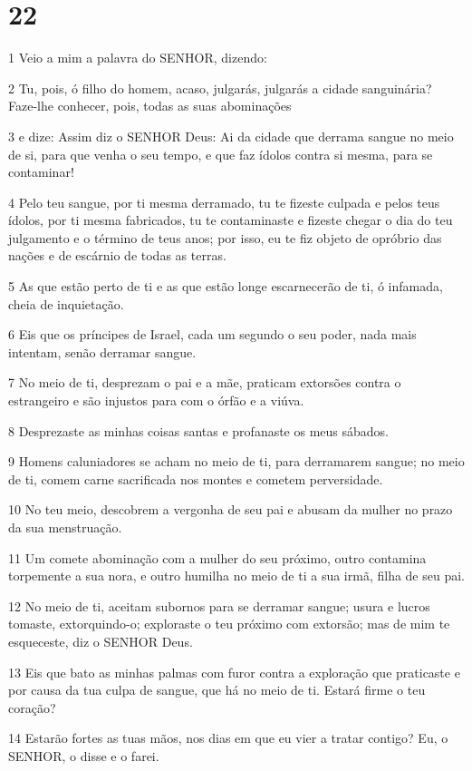 \chapter{22}

\par 1 Veio a mim a palavra do SENHOR, dizendo:
\par 2 Tu, pois, ó filho do homem, acaso, julgarás, julgarás a cidade sanguinária? Faze-lhe conhecer, pois, todas as suas abominações
\par 3 e dize: Assim diz o SENHOR Deus: Ai da cidade que derrama sangue no meio de si, para que venha o seu tempo, e que faz ídolos contra si mesma, para se contaminar!
\par 4 Pelo teu sangue, por ti mesma derramado, tu te fizeste culpada e pelos teus ídolos, por ti mesma fabricados, tu te contaminaste e fizeste chegar o dia do teu julgamento e o término de teus anos; por isso, eu te fiz objeto de opróbrio das nações e de escárnio de todas as terras.
\par 5 As que estão perto de ti e as que estão longe escarnecerão de ti, ó infamada, cheia de inquietação.
\par 6 Eis que os príncipes de Israel, cada um segundo o seu poder, nada mais intentam, senão derramar sangue.
\par 7 No meio de ti, desprezam o pai e a mãe, praticam extorsões contra o estrangeiro e são injustos para com o órfão e a viúva.
\par 8 Desprezaste as minhas coisas santas e profanaste os meus sábados.
\par 9 Homens caluniadores se acham no meio de ti, para derramarem sangue; no meio de ti, comem carne sacrificada nos montes e cometem perversidade.
\par 10 No teu meio, descobrem a vergonha de seu pai e abusam da mulher no prazo da sua menstruação.
\par 11 Um comete abominação com a mulher do seu próximo, outro contamina torpemente a sua nora, e outro humilha no meio de ti a sua irmã, filha de seu pai.
\par 12 No meio de ti, aceitam subornos para se derramar sangue; usura e lucros tomaste, extorquindo-o; exploraste o teu próximo com extorsão; mas de mim te esqueceste, diz o SENHOR Deus.
\par 13 Eis que bato as minhas palmas com furor contra a exploração que praticaste e por causa da tua culpa de sangue, que há no meio de ti. Estará firme o teu coração?
\par 14 Estarão fortes as tuas mãos, nos dias em que eu vier a tratar contigo? Eu, o SENHOR, o disse e o farei.
